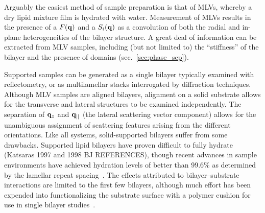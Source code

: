 \documentclass[8.5pt,twoside,twocolumn]{article}
\begin{document}
Arguably the easiest method of sample preparation is that of MLVs, whereby a dry lipid mixture film is hydrated with water. Measurement of MLVs results in the presence of a $F(\bf{q})$ and a $S_i(\bf{q})$ as a  convolution of both the radial and in-plane heterogeneities of the bilayer structure. A great deal of information can be extracted from MLV samples, including (but not limited to) the ``stiffness'' of the bilayer and the presence of domains (sec.~\ref{sec:phase_sep}).

Supported samples can be generated as a single bilayer typically examined with reflectometry, or as multilamellar stacks interrogated by diffraction techniques. Although MLV samples are aligned bilayers, alignment on a solid substrate allows for the transverse and lateral structures to be examined independently. The separation of ${\bf{q}}_z$ and ${\bf{q}}_{||}$ (the lateral scattering vector component) allows for the unambiguous assignment of scattering features arising from the different orientations. Like all systems, solid-supported bilayers suffer from some drawbacks. Supported lipid bilayers have proven difficult to fully hydrate (Katsaras 1997 and 1998 BJ REFERENCES), though recent advances in sample environments have achieved hydration levels of better than 99.6\% as determined by the lamellar repeat spacing~\cite{Armstrong.2013}. The effects attributed to bilayer--substrate interactions are limited to the first few bilayers, although much effort has been expended into functionalizing the substrate surface with a polymer cushion for use in single bilayer studies~\cite{Naumann.2002}.
\end{document}

